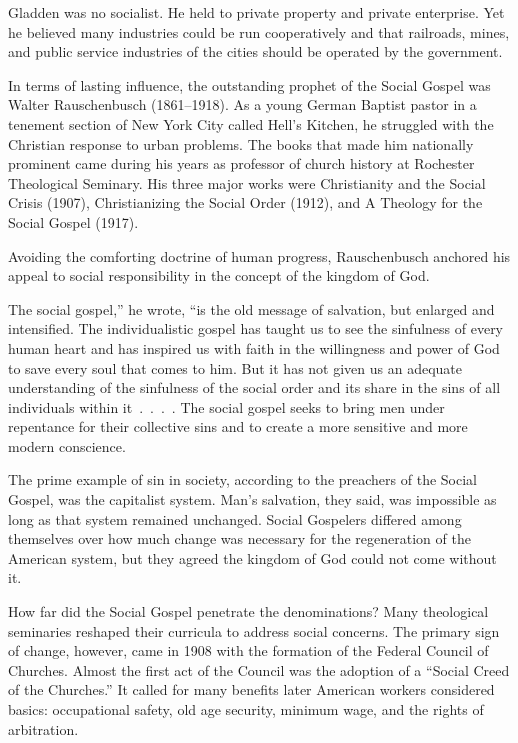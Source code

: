 Gladden was no socialist. He held to private property and private enterprise. Yet he believed many
industries could be run cooperatively and that railroads, mines, and public service industries of
the cities should be operated by the government.

In terms of lasting influence, the outstanding prophet of the Social Gospel was Walter Rauschenbusch
(1861–1918). As a young German Baptist pastor in a tenement section of New York City called Hell’s
Kitchen, he struggled with the Christian response to urban problems. The books that made him
nationally prominent came during his years as professor of church history at Rochester Theological
Seminary. His three major works were Christianity and the Social Crisis (1907), Christianizing the
Social Order (1912), and A Theology for the Social Gospel (1917).

Avoiding the comforting doctrine of human progress, Rauschenbusch anchored his appeal to social
responsibility in the concept of the kingdom of God.

\begin{blockquote}
The social gospel,” he wrote, “is the old message of salvation, but enlarged and intensified. The
individualistic gospel has taught us to see the sinfulness of every human heart and has inspired us
with faith in the willingness and power of God to save every soul that comes to him. But it has not
given us an adequate understanding of the sinfulness of the social order and its share in the sins
of all individuals within it~.~.~.~. The social gospel seeks to bring men under repentance for their
collective sins and to create a more sensitive and more modern conscience.
\end{blockquote}

The prime example of sin in society, according to the preachers of the Social Gospel, was the
capitalist system. Man’s salvation, they said, was impossible as long as that system remained
unchanged. Social Gospelers differed among themselves over how much change was necessary for the
regeneration of the American system, but they agreed the kingdom of God could not come without it.

How far did the Social Gospel penetrate the denominations? Many theological seminaries reshaped
their curricula to address social concerns. The primary sign of change, however, came in 1908 with
the formation of the Federal Council of Churches. Almost the first act of the Council was the
adoption of a “Social Creed of the Churches.” It called for many benefits later American workers
considered basics: occupational safety, old age security, minimum wage, and the rights of
arbitration.

